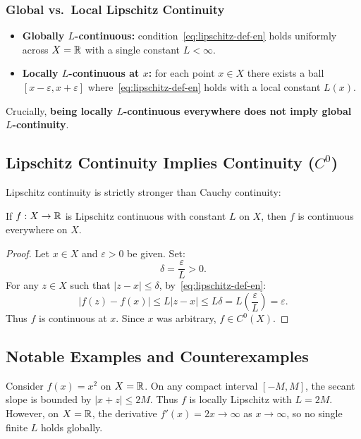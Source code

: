 \subsubsection{Global vs.\ Local Lipschitz Continuity}
\begin{itemize}
    \item \textbf{Globally $L$-continuous:} condition~\eqref{eq:lipschitz-def-en} holds uniformly across $X = \mathbb{R}$ with a single constant $L < \infty$.
    \item \textbf{Locally $L$-continuous at $x$:} for each point $x \in X$ there exists a ball $[x - \varepsilon, x + \varepsilon]$ where~\eqref{eq:lipschitz-def-en} holds with a local constant $L(x)$.
\end{itemize}
Crucially, \textbf{being locally $L$-continuous everywhere does not imply global $L$-continuity}.

\subsection{Lipschitz Continuity Implies Continuity ($C^0$)}
Lipschitz continuity is strictly stronger than Cauchy continuity:

\begin{theorem}
If $f: X \to \mathbb{R}$ is Lipschitz continuous with constant $L$ on $X$, then $f$ is continuous everywhere on $X$.
\end{theorem}
\begin{proof}
Let $x \in X$ and $\varepsilon > 0$ be given. Set:
\begin{equation}
    \delta = \frac{\varepsilon}{L} > 0.
\end{equation}
For any $z \in X$ such that $|z - x| \le \delta$, by~\eqref{eq:lipschitz-def-en}:
\begin{equation}
    |f(z) - f(x)| \le L |z - x| \le L \delta = L \left( \frac{\varepsilon}{L} \right) = \varepsilon.
\end{equation}
Thus $f$ is continuous at $x$. Since $x$ was arbitrary, $f \in C^0(X)$.
\end{proof}

\subsection{Notable Examples and Counterexamples}
\begin{example}
Consider $f(x) = x^2$ on $X = \mathbb{R}$. On any compact interval $[-M, M]$, the secant slope is bounded by $|x + z| \le 2M$. Thus $f$ is locally Lipschitz with $L = 2M$. However, on $X = \mathbb{R}$, the derivative $f'(x) = 2x \to \infty$ as $x \to \infty$, so no single finite $L$ holds globally.
\end{example}

